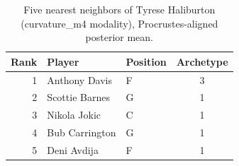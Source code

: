 \begin{table}[htbp]
  \centering\small
  \begin{tabular}{rllc}
    \toprule
    Rank & Player & Position & Archetype \\
    \midrule
    1 & Anthony Davis & F & 3 \\
    2 & Scottie Barnes & G & 1 \\
    3 & Nikola Jokic & C & 1 \\
    4 & Bub Carrington & G & 1 \\
    5 & Deni Avdija & F & 1 \\
    \bottomrule
  \end{tabular}
  \caption{Five nearest neighbors of Tyrese Haliburton (curvature_m4 modality), Procrustes-aligned posterior mean.}
  \label{tab:Tyrese_Haliburton_neighbors_curvature_m4}
\end{table}

